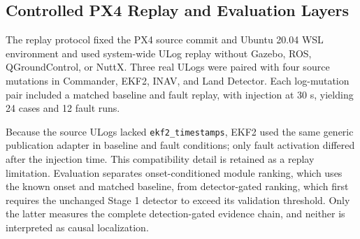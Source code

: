 \subsection{Controlled PX4 Replay and Evaluation Layers}

The replay protocol fixed the PX4 source commit and Ubuntu 20.04 WSL environment and used system-wide ULog replay without Gazebo, ROS, QGroundControl, or NuttX. Three real ULogs were paired with four source mutations in Commander, EKF2, INAV, and Land Detector. Each log-mutation pair included a matched baseline and fault replay, with injection at 30 s, yielding 24 cases and 12 fault runs.

Because the source ULogs lacked \texttt{ekf2\_timestamps}, EKF2 used the same generic publication adapter in baseline and fault conditions; only fault activation differed after the injection time. This compatibility detail is retained as a replay limitation. Evaluation separates onset-conditioned module ranking, which uses the known onset and matched baseline, from detector-gated ranking, which first requires the unchanged Stage 1 detector to exceed its validation threshold. Only the latter measures the complete detection-gated evidence chain, and neither is interpreted as causal localization.
